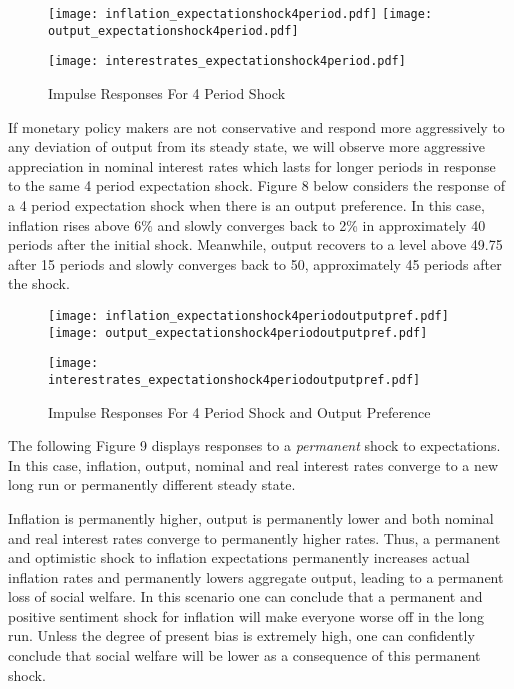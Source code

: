 \documentclass[12pt]{article}
\newcommand{\1}{\mathbbm 1}
\begin{document}
	
	
	
	
	
	 
		
		
			\begin{figure}[H]
			\texttt{[image: inflation\_expectationshock4period.pdf]}
			\hfill
			\texttt{[image: output\_expectationshock4period.pdf]}
			\hfill
			\begin{Center}
				\texttt{[image: interestrates\_expectationshock4period.pdf]}
			\end{Center}
			\caption{Impulse Responses For 4 Period Shock}
		\end{figure}
	
	
	If monetary policy makers are not conservative and respond more aggressively to any deviation of output from its steady state, we will observe more aggressive appreciation in nominal interest rates which lasts for longer periods in response to the same 4 period expectation shock. Figure 8 below considers the response of a 4 period expectation shock when there is an output preference. In this case, inflation rises above 6\% and slowly converges back to 2\% in approximately 40 periods after the initial shock. Meanwhile, output recovers to a level above 49.75 after 15 periods and slowly converges back to 50, approximately 45 periods after the shock.
	
	
	\begin{figure}[H]
		\texttt{[image: inflation\_expectationshock4periodoutputpref.pdf]}
		\hfill
		\texttt{[image: output\_expectationshock4periodoutputpref.pdf]}
		\hfill
		\begin{Center}
			\texttt{[image: interestrates\_expectationshock4periodoutputpref.pdf]}
		\end{Center}
		\caption{Impulse Responses For 4 Period Shock and Output Preference}
	\end{figure}


	
The following Figure 9 displays responses to a \textit{permanent} shock to expectations. In this case, inflation, output, nominal and real interest rates converge to a new long run or permanently different steady state.

Inflation is permanently higher, output is permanently lower and both nominal and real interest rates converge to permanently higher rates. Thus, a permanent and optimistic shock to inflation expectations permanently increases actual inflation rates and permanently lowers aggregate output, leading to a permanent loss of social welfare. In this scenario one can conclude that a permanent and positive sentiment shock for inflation will make everyone worse off in the long run. Unless the degree of present bias is extremely high, one can confidently conclude that social welfare will be lower as a consequence of this permanent shock.
\end{document}
